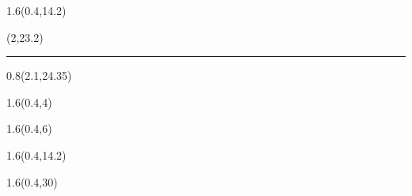 \begin{frame}[plain]
  \begin{textblock*}{1.6\TPHorizModule}(0.4\TPHorizModule,14.2\TPVertModule)
    \textcolor{black}{\titlefmt}
  \end{textblock*}

  \begin{textblock*}{\TPHorizModule}(2\TPHorizModule,23.2\TPVertModule)
    \textcolor{white}{\rule{\linewidth}{2\TPVertModule}}
  \end{textblock*}

  \begin{textblock*}{0.8\TPHorizModule}(2.1\TPHorizModule,24.35\TPVertModule)
    \textcolor{black}{\subtitlefmt}
  \end{textblock*}
\end{frame}


\begin{frame}[plain]
  \begin{textblock*}{1.6\TPHorizModule}(0.4\TPHorizModule,4\TPVertModule)
    \authorfmt
  \end{textblock*}

  \begin{textblock*}{1.6\TPHorizModule}(0.4\TPHorizModule,6\TPVertModule)
    \affiliation
  \end{textblock*}

  \begin{textblock*}{1.6\TPHorizModule}(0.4\TPHorizModule,14.2\TPVertModule)
    \titlefmt
  \end{textblock*}

  \begin{textblock*}{1.6\TPHorizModule}(0.4\TPHorizModule,30\TPVertModule)
    \edition
  \end{textblock*}
\end{frame}
\endgroup


